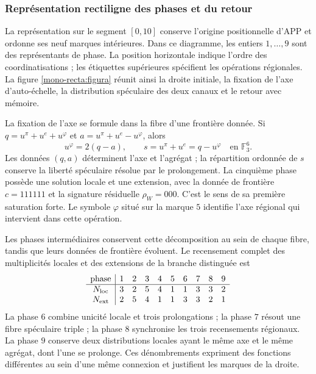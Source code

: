 \clearpage
\subsubsection{Représentation rectiligne des phases et du retour}
\label{mono-recta:desarrollo}

La représentation sur le segment \([0,10]\) conserve l'origine
positionnelle d'APP et ordonne ses neuf marques intérieures. Dans ce diagramme,
les entiers \(1,\ldots,9\) sont des représentants de phase. La position
horizontale indique l'ordre des coordinatisations ; les étiquettes supérieures
spécifient les opérations régionales. La figure
\ref{mono-recta:figura} réunit ainsi la droite initiale, la fixation de
l'axe d'auto-échelle, la distribution spéculaire des deux canaux et le
retour avec mémoire.



La fixation de l'axe se formule dans la fibre d'une frontière donnée. Si
\(q=u^\pi+u^e+u^\varphi\) et
\(a=u^\pi+u^e-u^\varphi\), alors
\[
 u^\varphi=2(q-a),\qquad s=u^\pi+u^e=q-u^\varphi
 \quad\text{en }\mathbb F_3^6.
\]
Les données \((q,a)\) déterminent l'axe et l'agrégat ; la répartition ordonnée de \(s\) conserve la liberté spéculaire résolue par le prolongement. La cinquième phase possède une solution locale et une extension, avec la donnée de frontière \(c=111111\) et la signature résiduelle \(\rho_W=000\). C'est le sens de sa première saturation forte. Le symbole \(\varphi\) situé sur la marque \(5\) identifie l'axe régional qui intervient dans cette opération.

Les phases intermédiaires conservent cette décomposition au sein de chaque fibre,
tandis que leurs données de frontière évoluent. Le recensement complet des
multiplicités locales et des extensions de la branche distinguée est
\[
\begin{array}{c|rrrrrrrrr}
\text{phase}&1&2&3&4&5&6&7&8&9\\\hline
N_{\rm loc}&3&2&5&4&1&1&3&3&2\\
N_{\rm ext}&2&5&4&1&1&3&3&2&1
\end{array}
\]
La phase \(6\) combine unicité locale et trois prolongations ; la phase
\(7\) résout une fibre spéculaire triple ; la phase \(8\) synchronise
les trois recensements régionaux. La phase \(9\) conserve deux distributions
locales ayant le même axe et le même agrégat, dont l'une se
prolonge. Ces dénombrements expriment des fonctions différentes au sein d'une
même connexion et justifient les marques de la droite.

